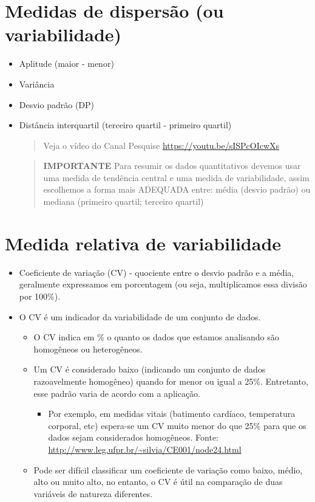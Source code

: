 \documentclass[
]{book}
\providecommand{\tightlist}{%
  \setlength{\itemsep}{0pt}\setlength{\parskip}{0pt}}
\begin{document}
\section{Medidas de dispersão (ou variabilidade)}\label{medidas-de-dispersuxe3o-ou-variabilidade}

\begin{itemize}
\item
  Aplitude (maior - menor)
\item
  Variância
\item
  Desvio padrão (DP)
\item
  Distância interquartil (terceiro quartil - primeiro quartil)

  \begin{quote}
  Veja o vídeo do Canal Pesquise \url{https://youtu.be/sISPcOIcwXs}
  \end{quote}

  \begin{quote}
  \textbf{IMPORTANTE} Para resumir os dados quantitativos devemos usar uma medida de tendência central e uma medida de variabilidade, assim escolhemos a forma mais ADEQUADA entre:
  média (desvio padrão) ou
  mediana (primeiro quartil; terceiro quartil)
  \end{quote}
\end{itemize}

\section{Medida relativa de variabilidade}\label{medida-relativa-de-variabilidade}

\begin{itemize}
\item
  Coeficiente de variação (CV) - quociente entre o desvio padrão e a média, geralmente expressamos em porcentagem (ou seja, multiplicamos essa divisão por 100\%).
\item
  O CV é um indicador da variabilidade de um conjunto de dados.

  \begin{itemize}
  \item
    O CV indica em \% o quanto os dados que estamos analisando são homogêneos ou heterogêneos.
  \item
    Um CV é considerado baixo (indicando um conjunto de dados razoavelmente homogêneo) quando for menor ou igual a 25\%. Entretanto, esse padrão varia de acordo com a aplicação.

    \begin{itemize}
    \tightlist
    \item
      Por exemplo, em medidas vitais (batimento cardíaco, temperatura corporal, etc) espera-se um CV muito menor do que 25\% para que os dados sejam considerados homogêneos. Fonte: \url{http://www.leg.ufpr.br/~silvia/CE001/node24.html}
    \end{itemize}
  \item
    Pode ser difícil classificar um coeficiente de variação como baixo, médio, alto ou muito alto, no entanto, o CV é útil na comparação de duas variáveis de natureza diferentes.
  \end{itemize}
\end{itemize}
\end{document}
